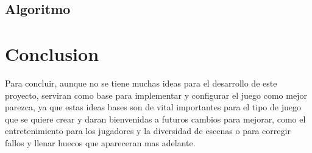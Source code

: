 \documentclass{article}
\begin{document}
\subsection{Algoritmo}


\newpage
\section{Conclusion} \label{conclusion}
Para concluir, aunque no se tiene muchas ideas para el desarrollo de este proyecto, serviran como base para implementar y configurar el juego como mejor parezca, ya que estas ideas bases son de vital importantes para el tipo de juego que se quiere crear y daran bienvenidas a futuros cambios para mejorar, como el entretenimiento para los jugadores y la diversidad de escenas o para corregir fallos y llenar huecos que apareceran mas adelante.
\end{document}
